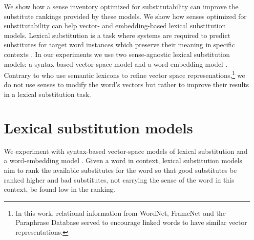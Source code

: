 \documentclass[11pt]{article}
\begin{document}
We show how a sense inventory optimized for substitutability can improve the substitute rankings provided by these models. We show how senses optimized for substitutability %
can help vector- and embedding-based lexical substitution models. Lexical substitution is a task where systems are required to predict substitutes  for target word instances which preserve their meaning in specific contexts \cite{mccarthy-navigli:07}. In our experiments we use two sense-agnostic lexical substitution models: a syntax-based vector-space model \cite{apidianaki:2016:EMNLP2016} and a word-embedding model \cite{melamud-levy-dagan:2015:VSM-NLP}. Contrary to  who use semantic lexicons %
to refine vector space represenations,\footnote{In this work, relational information from WordNet, FrameNet and the Paraphrase Database served to encourage linked words to have similar vector representations.} we do not use senses to modify the word's vectors but rather to improve their results in a lexical substitution task. 




\section{Lexical substitution models}

We experiment with syntax-based vector-space models of lexical substitution \cite{apidianaki:2016:EMNLP2016} and a word-embedding model \cite{melamud-levy-dagan:2015:VSM-NLP}. 
Given a word in context, lexical substitution models aim to rank the available substitutes for the word so that good substitutes be ranked higher and  bad substitutes, not carrying the sense of the word in this context, be found low in the ranking.






\end{document}

